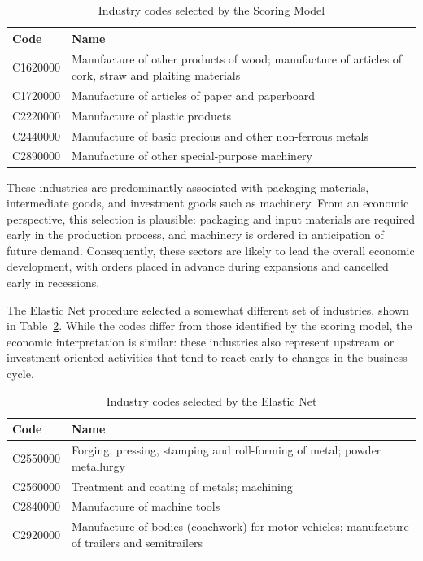 \begin{table}[H]
    \centering
    \caption{Industry codes selected by the Scoring Model}
    \label{tab:sm_sectors}
    \small
    \begin{tabularx}{0.9\linewidth}{lX}
        \toprule
        Code & Name \\
        \midrule
        C1620000 & Manufacture of other products of wood; manufacture of articles of cork, straw and plaiting materials \\
        C1720000 & Manufacture of articles of paper and paperboard \\
        C2220000 & Manufacture of plastic products \\
        C2440000 & Manufacture of basic precious and other non-ferrous metals \\
        C2890000 & Manufacture of other special-purpose machinery \\
        \bottomrule
    \end{tabularx}
\end{table}

These industries are predominantly associated with packaging materials, intermediate goods, and investment goods such as machinery. From an economic perspective, this selection is plausible: packaging and input materials are required early in the production process, and machinery is ordered in anticipation of future demand. Consequently, these sectors are likely to lead the overall economic development, with orders placed in advance during expansions and cancelled early in recessions.

The Elastic Net procedure selected a somewhat different set of industries, shown in Table~\ref{tab:en_sectors}. While the codes differ from those identified by the scoring model, the economic interpretation is similar: these industries also represent upstream or investment-oriented activities that tend to react early to changes in the business cycle.

\begin{table}[htbp]
    \centering
    \caption{Industry codes selected by the Elastic Net}
    \label{tab:en_sectors}
    \small
    \begin{tabularx}{0.9\linewidth}{lX}
        \toprule
        Code & Name \\
        \midrule
        C2550000 & Forging, pressing, stamping and roll-forming of metal; powder metallurgy \\
        C2560000 & Treatment and coating of metals; machining \\
        C2840000 & Manufacture of machine tools \\
        C2920000 & Manufacture of bodies (coachwork) for motor vehicles; manufacture of trailers and semitrailers \\
        \bottomrule
    \end{tabularx}
\end{table}


